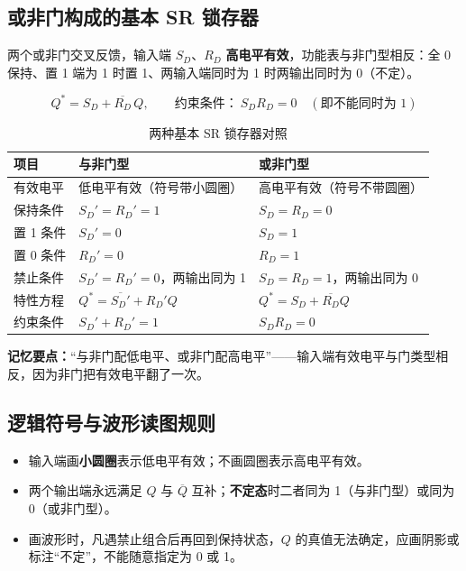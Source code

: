 \subsection{或非门构成的基本 SR 锁存器}
两个或非门交叉反馈，输入端 $S_D$、$R_D$ \textbf{高电平有效}，功能表与非门型相反：全 0 保持、置 1 端为 1 时置 1、两输入端同时为 1 时两输出同时为 0（不定）。

\begin{equation}
Q^* = S_D + \overline{R_D}\,Q,
\qquad
\text{约束条件：}\ S_D R_D = 0
\quad(\text{即不能同时为 }1)
\label{eq:sr_nor}
\end{equation}

\begin{table}[!htbp]
\centering
\caption{两种基本 SR 锁存器对照}
\begin{tabular}{>{\raggedright\arraybackslash}p{2.9cm}>{\raggedright\arraybackslash}p{5.1cm}>{\raggedright\arraybackslash}p{5.1cm}}
\toprule
项目 & 与非门型 & 或非门型 \\
\midrule
有效电平 & 低电平有效（符号带小圆圈） & 高电平有效（符号不带圆圈） \\
保持条件 & $S_D'=R_D'=1$ & $S_D=R_D=0$ \\
置 1 条件 & $S_D'=0$ & $S_D=1$ \\
置 0 条件 & $R_D'=0$ & $R_D=1$ \\
禁止条件 & $S_D'=R_D'=0$，两输出同为 1 & $S_D=R_D=1$，两输出同为 0 \\
特性方程 & $Q^*=\overline{S_D'}+R_D'Q$ & $Q^*=S_D+\overline{R_D}Q$ \\
约束条件 & $S_D'+R_D'=1$ & $S_D R_D=0$ \\
\bottomrule
\end{tabular}
\end{table}

\noindent\textbf{记忆要点：}“与非门配低电平、或非门配高电平”——输入端有效电平与门类型相反，因为非门把有效电平翻了一次。

\subsection{逻辑符号与波形读图规则}
\begin{itemize}
    \item 输入端画\textbf{小圆圈}表示低电平有效；不画圆圈表示高电平有效。
    \item 两个输出端永远满足 $Q$ 与 $\overline{Q}$ 互补；\textbf{不定态}时二者同为 1（与非门型）或同为 0（或非门型）。
    \item 画波形时，凡遇禁止组合后再回到保持状态，$Q$ 的真值无法确定，应画阴影或标注“不定”，不能随意指定为 0 或 1。
\end{itemize}

